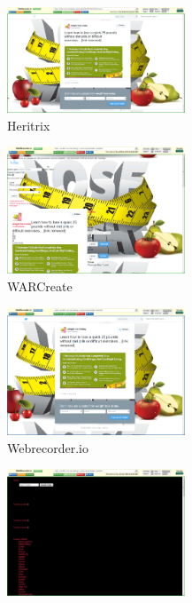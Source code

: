 \documentclass{article}
\begin{document}
\begin{center}
\begin{figure}[ht]
    \centering
    \includegraphics[width=0.475\textwidth,natwidth=700,natheight=700]{ex1-heritrix.png}
    \caption{Heritrix}
    \label{fig:url1_heritrix}
\end{figure}
\begin{figure}[ht]
    \centering
    \includegraphics[width=0.475\textwidth,natwidth=700,natheight=700]{ex1-warcreate.png}
    \caption{WARCreate}
    \label{fig:url1_war_create}
\end{figure}
\begin{figure}[ht]
    \centering
    \includegraphics[width=0.475\textwidth,natwidth=700,natheight=700]{ex1-webrecorder.png}
    \caption{Webrecorder.io}
    \label{fig:url1_webrecorder}
\end{figure}
\begin{figure}[ht]
    \centering
    \includegraphics[width=0.475\textwidth,natwidth=700,natheight=700]{ex1-wget.png}

\end{figure}
\end{center}
\end{document}
